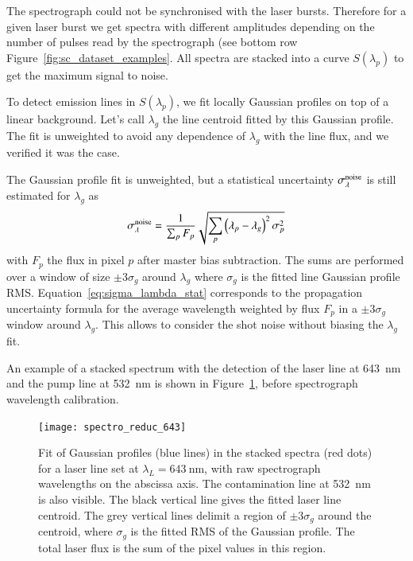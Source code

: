 The spectrograph could not be synchronised with the laser bursts. Therefore for a given laser burst we get spectra with different amplitudes depending on the number of pulses read by the spectrograph (see bottom row Figure~\ref{fig:sc_dataset_examples}.
All spectra are stacked into a curve $S(\lambda_p)$ to get the maximum signal to noise.

To detect emission lines in $S(\lambda_p)$, we fit locally Gaussian profiles on top of a linear background. Let's call $\lambda_g$ the line centroid fitted by this Gaussian profile. The fit is unweighted to avoid any dependence of $\lambda_g$ with the line flux, and we verified it was the case. 

The Gaussian profile fit is unweighted, but a statistical uncertainty $\sigma_\lambda^{\rm noise}$ is still estimated for $\lambda_g$ as 
\begin{equation}\label{eq:sigma_lambda_stat}
    \sigma_\lambda^{\rm noise}= \dfrac{1}{\sum_p F_p} \sqrt{\sum_p \left(\lambda_p - \lambda_g\right)^2 \sigma_p^2}
\end{equation}
with $F_p$ the flux in pixel $p$ after master bias subtraction. The sums are performed over a window of size $\pm 3 \sigma_g$ around $\lambda_g$ where $\sigma_g$ is the fitted line Gaussian profile RMS. Equation~\ref{eq:sigma_lambda_stat} corresponds to the propagation uncertainty formula for the average wavelength weighted by flux $F_p$ in a $\pm 3 \sigma_g$  window around $\lambda_g$. This allows to consider the shot noise without biasing the $\lambda_g$ fit.

An example of a stacked spectrum with the detection of the laser line at \SI{643}{\nm} and the pump line at \SI{532}{\nm} is shown in Figure~\ref{fig:spectro_reduc_643}, before spectrograph wavelength calibration. %

\begin{figure}[!h]
\centering
\texttt{[image: spectro\_reduc\_643]}
\caption{Fit of Gaussian profiles (blue lines) in the stacked spectra (red dots) for a laser line set at $\lambda_L=\SI{643}{\nm}$, with raw spectrograph wavelengths on the abscissa axis. The contamination line at \SI{532}{nm} is also visible. The black vertical line gives the fitted laser line centroid. The grey vertical lines delimit a region of $\pm 3\sigma_g$ around the centroid, where $\sigma_g$ is the fitted RMS of the Gaussian profile. The total laser flux is the sum of the pixel values in this region.}\label{fig:spectro_reduc_643}
\end{figure}




